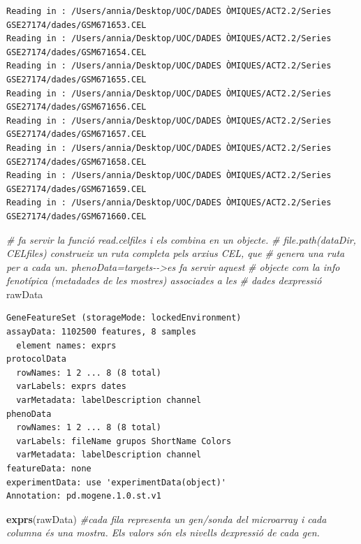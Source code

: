 \documentclass[
]{article}
\newenvironment{Shaded}{\begin{snugshade}}{\end{snugshade}}
\newcommand{\CommentTok}[1]{\textcolor[rgb]{0.56,0.35,0.01}{\textit{#1}}}
\newcommand{\FunctionTok}[1]{\textcolor[rgb]{0.13,0.29,0.53}{\textbf{#1}}}
\newcommand{\NormalTok}[1]{#1}
\begin{document}
\begin{verbatim}
Reading in : /Users/annia/Desktop/UOC/DADES ÒMIQUES/ACT2.2/Series GSE27174/dades/GSM671653.CEL
Reading in : /Users/annia/Desktop/UOC/DADES ÒMIQUES/ACT2.2/Series GSE27174/dades/GSM671654.CEL
Reading in : /Users/annia/Desktop/UOC/DADES ÒMIQUES/ACT2.2/Series GSE27174/dades/GSM671655.CEL
Reading in : /Users/annia/Desktop/UOC/DADES ÒMIQUES/ACT2.2/Series GSE27174/dades/GSM671656.CEL
Reading in : /Users/annia/Desktop/UOC/DADES ÒMIQUES/ACT2.2/Series GSE27174/dades/GSM671657.CEL
Reading in : /Users/annia/Desktop/UOC/DADES ÒMIQUES/ACT2.2/Series GSE27174/dades/GSM671658.CEL
Reading in : /Users/annia/Desktop/UOC/DADES ÒMIQUES/ACT2.2/Series GSE27174/dades/GSM671659.CEL
Reading in : /Users/annia/Desktop/UOC/DADES ÒMIQUES/ACT2.2/Series GSE27174/dades/GSM671660.CEL
\end{verbatim}

\begin{Shaded}
\begin{Highlighting}[]
\CommentTok{\# fa servir la funció read.celfiles i els combina en un objecte.}
\CommentTok{\# file.path(dataDir, CELfiles) construeix un ruta completa pels arxius CEL, que}
\CommentTok{\# genera una ruta per a cada un. phenoData=targets{-}{-}\textgreater{}es fa servir aquest}
\CommentTok{\# objecte com la info fenotípica (metadades de les mostres) associades a les}
\CommentTok{\# dades d\textquotesingle{}expressió}
\NormalTok{rawData}
\end{Highlighting}
\end{Shaded}

\begin{verbatim}
GeneFeatureSet (storageMode: lockedEnvironment)
assayData: 1102500 features, 8 samples 
  element names: exprs 
protocolData
  rowNames: 1 2 ... 8 (8 total)
  varLabels: exprs dates
  varMetadata: labelDescription channel
phenoData
  rowNames: 1 2 ... 8 (8 total)
  varLabels: fileName grupos ShortName Colors
  varMetadata: labelDescription channel
featureData: none
experimentData: use 'experimentData(object)'
Annotation: pd.mogene.1.0.st.v1 
\end{verbatim}

\begin{Shaded}
\begin{Highlighting}[]
\FunctionTok{exprs}\NormalTok{(rawData)  }\CommentTok{\#cada fila representa un gen/sonda del microarray i cada columna és una mostra. Els valors són els nivells d\textquotesingle{}expressió de cada gen.}
\end{Highlighting}
\end{Shaded}
\end{document}
